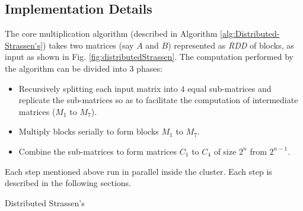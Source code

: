 \subsection{Implementation Details}
The core multiplication algorithm (described in Algorithm \ref{alg:Distributed-Strassen's}) takes two matrices (say $A$ and $B$) represented as \textit{RDD} of blocks, as input as shown in Fig. \ref{fig:distributedStrassen}. The computation performed by the algorithm can be divided into 3 phases:

\begin{itemize}
    \item Recursively splitting each input matrix into $4$ equal sub-matrices and replicate the sub-matrices so as to facilitate the computation of intermediate matrices ($M_{1}$ to $M_{7}$).
    \item Multiply blocks serially to form blocks $M_{1}$ to $M_{7}$.
    \item Combine the sub-matrices to form matrices $C_{1}$ to $C_{4}$ of size $2^{n}$ from $2^{n-1}$.
\end{itemize}

Each step mentioned above run in parallel inside the cluster. Each step is described in the following sections.

\begin{algorithm}
\SetAlgoLined
{}
\caption{Distributed Strassen's}
\label{alg:Distributed-Strassen's}
\end{algorithm}

